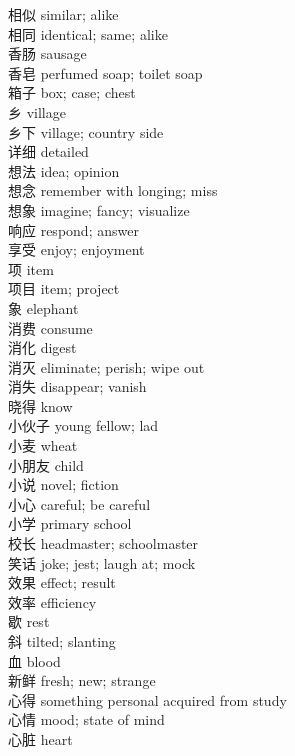 相似 \quad similar; alike\\
相同 \quad identical; same; alike\\
香肠 \quad sausage\\
香皂 \quad perfumed soap; toilet soap\\
箱子 \quad box; case; chest\\
乡 \quad village\\
乡下 \quad village; country side\\
详细 \quad detailed\\
想法 \quad idea; opinion\\
想念 \quad remember with longing; miss\\
想象 \quad imagine; fancy; visualize\\
响应 \quad respond; answer\\
享受 \quad enjoy; enjoyment\\
项 \quad item\\
项目 \quad item; project\\
象 \quad elephant\\
消费 \quad consume\\
消化 \quad digest\\
消灭 \quad eliminate; perish; wipe out\\
消失 \quad disappear; vanish\\
晓得 \quad know\\
小伙子 \quad young fellow; lad\\
小麦 \quad wheat\\
小朋友 \quad child\\
小说 \quad novel; fiction\\
小心 \quad careful; be careful\\
小学 \quad primary school\\
校长 \quad headmaster; schoolmaster\\
笑话 \quad joke; jest; laugh at; mock\\
效果 \quad effect; result\\
效率 \quad efficiency\\
歇 \quad rest\\
斜 \quad tilted; slanting\\
血 \quad blood\\
新鲜 \quad fresh; new; strange\\
心得 \quad something personal acquired from study\\
心情 \quad mood; state of mind\\
心脏 \quad heart\\
